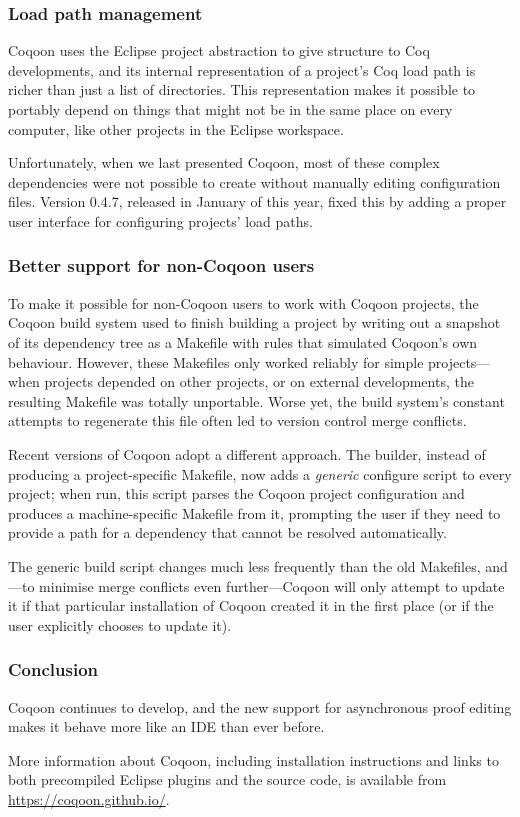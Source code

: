 \documentclass{article}
\begin{document}
\subsubsection*{Load path management}

Coqoon uses the Eclipse project abstraction to give structure to Coq
developments, and its internal representation of a project's Coq load path is
richer than just a list of directories. This representation makes it possible
to portably depend on things that might not be in the same place on every
computer, like other projects in the Eclipse workspace.

Unfortunately, when
we last presented Coqoon, most of
these complex dependencies were not possible to create without manually editing
configuration files.
Version 0.4.7, released in January of this year, fixed this by adding a proper
user interface for
configuring projects' load paths.

\subsubsection*{Better support for non-Coqoon users}

To make it possible for non-Coqoon users to work with Coqoon projects, the
Coqoon build system used to finish building a project by writing out a snapshot
of its dependency tree as a Makefile with rules that simulated Coqoon's own
behaviour. However, these Makefiles only worked
reliably for simple projects---when projects depended on other projects, or on
external developments, the resulting Makefile was totally unportable. Worse
yet, the build system's constant attempts to regenerate this file often led to
version control merge conflicts.

Recent versions of Coqoon adopt a different approach. The builder, instead of
producing a project-specific Makefile, now adds a \emph{generic} configure
script to
every project; when run, this script parses the Coqoon project configuration
and produces a machine-specific Makefile from it, prompting the user if they
need to provide a path for a dependency that cannot be resolved automatically.

The generic build script changes much less frequently than the old Makefiles,
and---to minimise merge conflicts even further---Coqoon will only attempt to
update it if that particular installation of Coqoon created it in the first
place (or if the user explicitly chooses to update it).

\subsubsection*{Conclusion}

Coqoon continues to develop, and the new support for asynchronous proof editing
makes it behave more like an IDE than ever before.

More information about Coqoon, including installation instructions and links to
both precompiled Eclipse plugins and the source code, is available from
\linebreak
\url{https://coqoon.github.io/}.



\end{document}
